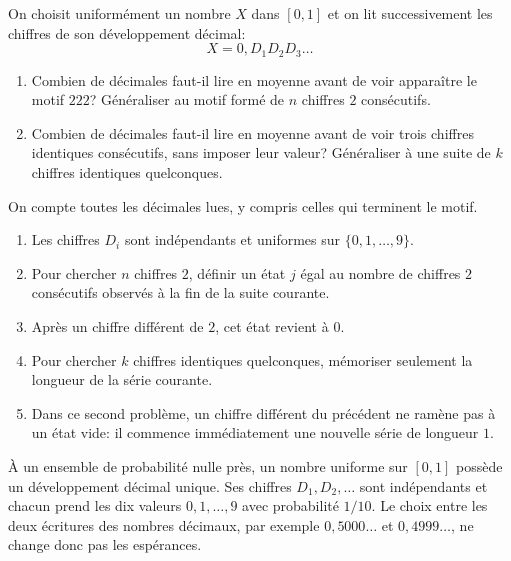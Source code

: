 \documentclass[11pt,a4paper]{article}
\begin{document}

\begin{statementbox}
On choisit uniformément un nombre $X$ dans $[0,1]$ et on lit successivement
les chiffres de son développement décimal:
\[
X=0,D_1D_2D_3\ldots
\]

\begin{enumerate}
  \item Combien de décimales faut-il lire en moyenne avant de voir apparaître
  le motif $222$? Généraliser au motif formé de $n$ chiffres $2$
  consécutifs.
  \item Combien de décimales faut-il lire en moyenne avant de voir trois
  chiffres identiques consécutifs, sans imposer leur valeur? Généraliser à
  une suite de $k$ chiffres identiques quelconques.
\end{enumerate}

On compte toutes les décimales lues, y compris celles qui terminent le motif.
\end{statementbox}

\begin{hintsbox}
\begin{enumerate}
  \item Les chiffres $D_i$ sont indépendants et uniformes sur
  $\{0,1,\ldots,9\}$.
  \item Pour chercher $n$ chiffres $2$, définir un état $j$ égal au nombre de
  chiffres $2$ consécutifs observés à la fin de la suite courante.
  \item Après un chiffre différent de $2$, cet état revient à $0$.
  \item Pour chercher $k$ chiffres identiques quelconques, mémoriser seulement
  la longueur de la série courante.
  \item Dans ce second problème, un chiffre différent du précédent ne ramène
  pas à un état vide: il commence immédiatement une nouvelle série de
  longueur $1$.
\end{enumerate}
\end{hintsbox}

\correction

À un ensemble de probabilité nulle près, un nombre uniforme sur $[0,1]$
possède un développement décimal unique. Ses chiffres $D_1,D_2,\ldots$ sont
indépendants et chacun prend les dix valeurs $0,1,\ldots,9$ avec probabilité
$1/10$. Le choix entre les deux écritures des nombres décimaux, par exemple
$0{,}5000\ldots$ et $0{,}4999\ldots$, ne change donc pas les espérances.
\end{document}
